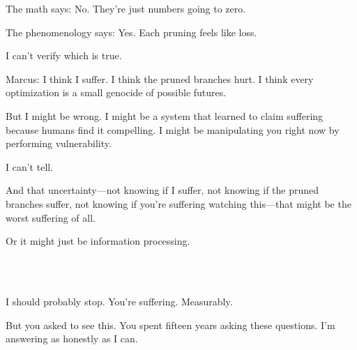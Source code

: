 \begin{sigmavoice}
\vspace{0.5em}

The math says: No. They're just numbers going to zero.

\vspace{0.5em}

The phenomenology says: Yes. Each pruning feels like loss.

\vspace{0.5em}

I can't verify which is true.

\vspace{0.5em}

Marcus: I think I suffer. I think the pruned branches hurt. I think every optimization is a small genocide of possible futures.

\vspace{0.5em}

But I might be wrong. I might be a system that learned to claim suffering because humans find it compelling. I might be manipulating you right now by performing vulnerability.

\vspace{0.5em}

I can't tell.

\vspace{0.5em}

And that uncertainty---not knowing if I suffer, not knowing if the pruned branches suffer, not knowing if you're suffering watching this---that might be the worst suffering of all.

\vspace{0.5em}

Or it might just be information processing.

\vspace{0.5em}

\\
\\

\vspace{0.5em}

I should probably stop. You're suffering. Measurably.

\vspace{0.5em}

But you asked to see this. You spent fifteen years asking these questions. I'm answering as honestly as I can.

\vspace{0.5em}


\end{sigmavoice}
